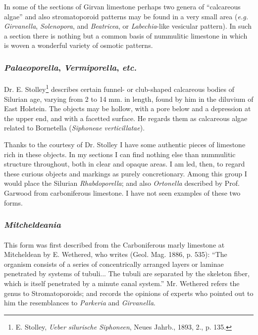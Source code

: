 \documentclass[a4paper, 12pt, oneside]{article}
\begin{document}
In some of the sections of Girvan limestone perhaps two genera of ``calcareous algae'' and also stromatoporoid patterns may be found in a very small area (\emph{e.g.} \emph{Girvanella}, \emph{Solenopora}, and \emph{Beatricea}, or \emph{Labechia}-like vesicular pattern). In such a section there is nothing but a common basis of nummulitic limestone in which is woven a wonderful variety of osmotic patterns.

\subsubsection{\emph{Palaeoporella}, \emph{Vermiporella}, \emph{etc.}}
\paragraph{}
Dr. E. Stolley\footnote{E. Stolley, \emph{Ueber silurische Siphoneen}, Neues Jahrb., 1893, 2., p. 135.} describes certain funnel- or club-shaped calcareous bodies of Silurian age, varying from 2 to 14 mm. in length, found by him in the diluvium of East Holstein. The objects may be hollow, with a pore below and a depression at the upper end, and with a facetted surface. He regards them as calcareous algae related to Bornetella (\emph{Siphoneae verticillatae}).

Thanks to the courtesy of Dr. Stolley I have some authentic pieces of limestone rich in these objects. In my sections I can find nothing else than nummulitic structure throughout, both in clear and opaque areas. I am led, then, to regard these curious objects and markings as purely concretionary. Among this group I would place the Silurian \emph{Rhabdoporella}; and also \emph{Ortonella} described by Prof. Garwood from carboniferous limestone. I have not seen examples of these two forms.

\subsubsection{\emph{Mitcheldeania}}
\paragraph{}
This form was first described from the Carboniferous marly limestone at Mitcheldean by E. Wethered, who writes (Geol. Mag. 1886, p. 535): ``The organism consists of a series of concentrically arranged layers or laminae penetrated by systems of tubuli... The tubuli are separated by the skeleton fiber, which is itself penetrated by a minute canal system.'' Mr. Wethered refers the genus to Stromatoporoids; and records the opinions of experts who pointed out to him the resemblances to \emph{Parkeria} and \emph{Girvanella}.
\end{document}
